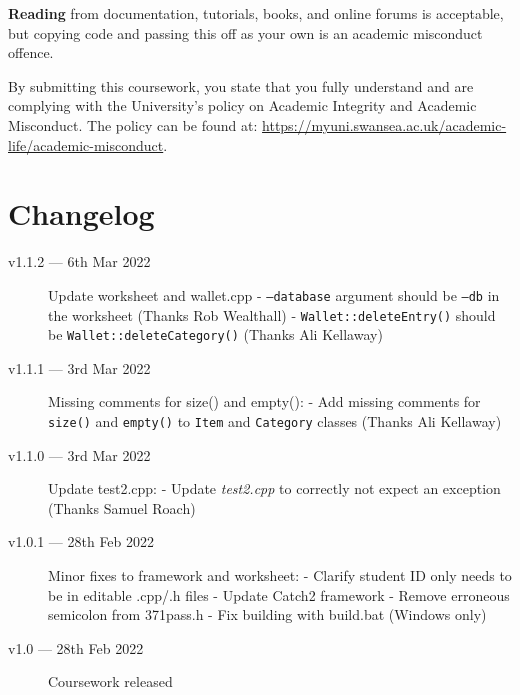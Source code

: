\documentclass[a4paper]{article}
\begin{document}
\textbf{Reading} from documentation, tutorials, books, and online forums is acceptable, but copying code and passing this off as your own is an academic misconduct offence.

By submitting this coursework, you state that you fully understand and are complying with the University’s policy on Academic Integrity and Academic Misconduct. The policy can be found at: \url{https://myuni.swansea.ac.uk/academic-life/academic-misconduct}.


\newpage\section*{Changelog}\label{sec:changelog}
\begin{description}
    \item[v1.1.2 --- 6th Mar 2022] Update worksheet and wallet.cpp\newline
			- \texttt{--database} argument should be \texttt{--db} in the worksheet (Thanks Rob Wealthall)\newline
			- \texttt{Wallet::deleteEntry()} should be \texttt{Wallet::deleteCategory()} (Thanks Ali Kellaway)

    \item[v1.1.1 --- 3rd Mar 2022] Missing comments for size() and empty():\newline
			- Add missing comments for \texttt{size()} and \texttt{empty()} to \texttt{Item} and \texttt{Category} classes (Thanks Ali Kellaway)

    \item[v1.1.0 --- 3rd Mar 2022] Update test2.cpp:\newline
			- Update \emph{test2.cpp} to correctly not expect an exception (Thanks Samuel Roach)

    \item[v1.0.1 --- 28th Feb 2022] Minor fixes to framework and worksheet:\newline
			- Clarify student ID only needs to be in editable .cpp/.h files\newline
		  - Update Catch2 framework\newline
		  - Remove erroneous semicolon from 371pass.h\newline
		  - Fix building with build.bat (Windows only)

    \item[v1.0   --- 28th Feb 2022]
			Coursework released
\end{description}
\end{document}
